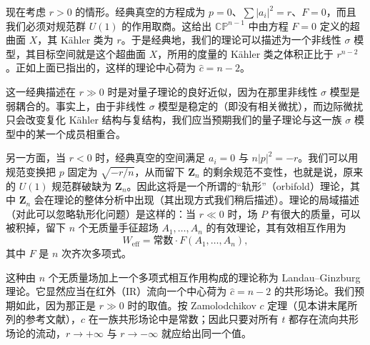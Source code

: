 现在考虑 $r>0$ 的情形。经典真空的方程成为 $p=0$、$\sum|a_i|^{2}=r$、$F=0$，而且我们必须对规范群 $U(1)$ 的作用取商。这给出 $\mathbb{CP}^{n-1}$ 中由方程 $F=0$ 定义的超曲面 $X$，其 Kähler 类为 $r$。于是经典地，我们的理论可以描述为一个非线性 $\sigma$ 模型，其目标空间就是这个超曲面 $X$，所用的度量的 Kähler 类之体积正比于 $r^{n-2}$。正如上面已指出的，这样的理论中心荷为 $\hat c=n-2$。


这一经典描述在 $r\gg0$ 时是对量子理论的良好近似，因为在那里非线性 $\sigma$ 模型是弱耦合的。事实上，由于非线性 $\sigma$ 模型是稳定的（即没有相关微扰），而边际微扰只会改变复化 Kähler 结构与复结构，我们应当预期我们的量子理论与这一族 $\sigma$ 模型中的某一个成员相重合。

另一方面，当 $r<0$ 时，经典真空的空间满足 $a_i=0$ 与 $n|p|^{2}=-r$。我们可以用规范变换把 $p$ 固定为 $\sqrt{-r/n}$，从而留下 $\mathbf{Z}_n$ 的剩余规范不变性，也就是说，原来的 $U(1)$ 规范群破缺为 $\mathbf{Z}_n$。因此这将是一个所谓的“轨形”（orbifold）理论，其中 $\mathbf{Z}_n$ 会在理论的整体分析中出现（其出现方式我们稍后描述）。理论的局域描述（对此可以忽略轨形化问题）是这样的：当 $r\ll0$ 时，场 $P$ 有很大的质量，可以被积掉，留下 $n$ 个无质量手征超场 $A_1,\dots,A_n$ 的有效理论，其有效相互作用为
\[
  W_{\mathrm{eff}}=\text{常数}\cdot F(A_1,\dots,A_n),
\]
其中 $F$ 是 $n$ 次齐次多项式。

这种由 $n$ 个无质量场加上一个多项式相互作用构成的理论称为 Landau–Ginzburg 理论。它显然应当在红外（IR）流向一个中心荷为 $\hat c=n-2$ 的共形场论。我们预期如此，因为那正是 $r\gg0$ 时的取值。按 Zamolodchikov $c$ 定理（见本讲末尾所列的参考文献），$c$ 在一族共形场论中是常数；因此只要对所有 $t$ 都存在流向共形场论的流动，$r\to+\infty$ 与 $r\to-\infty$ 就应给出同一个值。


